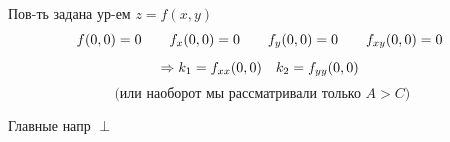 \documentclass[main]{subfiles}
\begin{document}
    \begin{consequence}[1]
        Пов-ть задана ур-ем $z = f(x, y)$
        \[f(0, 0) = 0 \qquad f_x(0, 0) = 0 \qquad f_y(0, 0) = 0 \qquad f_{xy}(0, 0) = 0 \]
        \[\Rightarrow k_1 = f_{xx}(0, 0) \quad k_2 = f_{yy} (0, 0)\]
        \[\text{ (или наоборот мы
        рассматривали только } A > C)\]
    \end{consequence}

    \begin{consequence}[2]
        Главные напр $\perp$
    \end{consequence}
\end{document}
